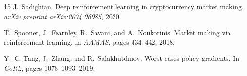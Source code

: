 \documentclass[11pt,twocolumn]{article}
\begin{document}
\begin{thebibliography}{15}
J.~Sadighian.
\newblock Deep reinforcement learning in cryptocurrency market making.
\newblock \emph{arXiv preprint arXiv:2004.06985}, 2020.

T.~Spooner, J.~Fearnley, R.~Savani, and A.~Koukorinis.
\newblock Market making via reinforcement learning.
\newblock In \emph{AAMAS}, pages 434--442, 2018.

Y.~C. Tang, J.~Zhang, and R.~Salakhutdinov.
\newblock Worst cases policy gradients.
\newblock In \emph{CoRL}, pages 1078--1093, 2019.

\end{thebibliography}
\end{document}
